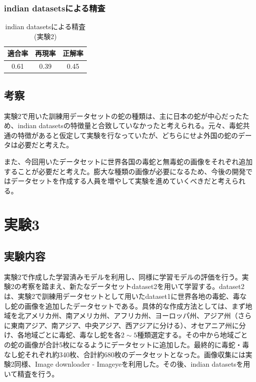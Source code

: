 \documentclass[a4paper, 11pt, titlepage]{jsarticle}
\begin{document}
\clearpage

\subsubsection{indian datasetsによる精査}
\begin{table}[htb]
\centering
  \caption{indian datasetsによる精査(実験2)}
  \begin{tabular}{|c|c|c|}  \hline
    適合率 & 再現率 & 正解率 \\ \hline
    0.61 & 0.39 & 0.45 \\ \hline
  \end{tabular}
\end{table}

\subsection{考察}
実験2で用いた訓練用データセットの蛇の種類は、主に日本の蛇が中心だったため、indian datasetsの特徴量と合致していなかったと考えられる。元々、毒蛇共通の特徴があると仮定して実験を行なっていたが、どちらにせよ外国の蛇のデータは必要だと考えた。\par
また、今回用いたデータセットに世界各国の毒蛇と無毒蛇の画像をそれぞれ追加することが必要だと考えた。膨大な種類の画像が必要になるため、今後の開発ではデータセットを作成する人員を増やして実験を進めていくべきだと考えられる。

\section{実験3}
\subsection{実験内容}
実験2で作成した学習済みモデルを利用し、同様に学習モデルの評価を行う。実験2の考察を踏まえ、新たなデータセットdataset2を用いて学習する。dataset2は、実験2で訓練用データセットとして用いたdataset1に世界各地の毒蛇、毒なし蛇の画像を追加したデータセットである。具体的な作成方法としては、まず地域を北アメリカ州、南アメリカ州、アフリカ州、ヨーロッパ州、アジア州（さらに東南アジア、南アジア、中央アジア、西アジアに分ける）、オセアニア州に分け、各地域ごとに毒蛇、毒なし蛇を各$2\sim5$種類選定する。その中から地域ごとの蛇の画像が合計5枚になるようにデータセットに追加した。最終的に毒蛇・毒なし蛇それぞれ約340枚、合計約680枚のデータセットとなった。画像収集には実験2同様、Image downloader - Imageyeを利用した。その後、indian datasetsを用いて精査を行う。\par
\end{document}
